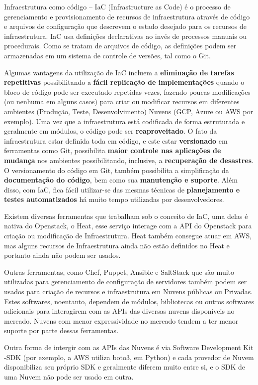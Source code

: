 \documentclass[12pt]{article}
\begin{document}
	Infraestrutura como código – IaC (Infrastructure as Code) é o processo de gerenciamento e provisionamento de recursos de infraestrutura através de código e arquivos de configuração que descrevem o estado desejado para os recursos de infraestrutura. IaC usa definições declarativas ao invés de processos manuais ou procedurais. Como se tratam de arquivos de código, as definições podem ser armazenadas em um sistema de controle de versões, tal como o Git.
	
	Algumas vantagens da utilização de IaC incluem a \textbf{eliminação de tarefas repetitivas} possibilitando a  \textbf{fácil replicação de implementações} quando o bloco de código pode ser executado repetidas vezes, fazendo poucas modificações (ou nenhuma em alguns casos) para criar ou modificar recursos em diferentes ambientes (Produção, Teste, Desenvolvimento) Nuvens (GCP, Azure ou AWS por exemplo). Uma vez que a infraestrutura  está codificada de forma estruturada e geralmente em módulos, o código pode ser \textbf{reaproveitado}. O fato da infraestrutura estar definida toda em código, e este estar \textbf{versionado} em ferramentas como Git, possibilita \textbf{maior controle nas aplicações de mudança} nos ambientes possibilitando, inclusive, a \textbf{recuperação de desastres}. O versionamento do código em Git, também possibilita a simplificação da \textbf{documentação do código}, bem como sua \textbf{manutenção e suporte}. Além disso, com IaC, fica fácil utilizar-se das mesmas técnicas de \textbf{planejamento e testes automatizados} há muito tempo utilizadas por desenvolvedores.
	
	Existem diversas ferramentas que trabalham sob o conceito de IaC, uma delas é nativa do Openstack, o Heat, esse serviço interage com a API do Openstack para criação ou modificação de Infraestrutura. Heat também consegue atuar em AWS, mas alguns recursos de Infraestrutura ainda não estão definidos no Heat e portanto ainda não podem ser usados. 
	
	Outras ferramentas, como Chef, Puppet, Ansible e SaltStack que são muito utilizadas para gerenciamento de configuração de servidores também podem ser usados para criação de recursos e infraestrutura em Nuvens públicas ou Privadas. Estes softwares, noentanto, dependem de módulos, bibliotecas ou outros softwares adicionais para interagirem com as APIs das diversas nuvens disponíveis no mercado. Nuvens com menor expressividade no mercado tendem a ter menor suporte por parte dessas ferramentas.
	
	Outra forma de intergir com as APIs das Nuvens é via Software Development Kit -SDK (por exemplo, a AWS utiliza boto3, em Python) e cada provedor de Nuvem disponibiliza seu próprio SDK e geralmente diferem muito entre si, e o SDK de uma Nuvem não pode ser usado em outra.
	
\end{document}
